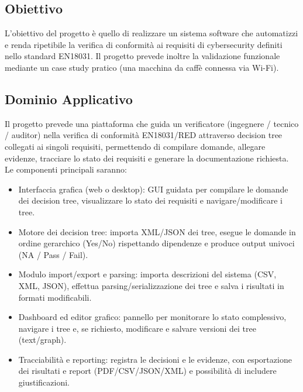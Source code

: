 \documentclass[a4paper,12pt]{article}
\begin{document}
    \subsection{Obiettivo}
    L’obiettivo del progetto è quello di realizzare un sistema software che automatizzi e renda ripetibile la verifica di conformità ai requisiti di cybersecurity definiti nello standard EN18031. Il progetto prevede inoltre la validazione funzionale mediante un case study pratico (una macchina da caffè connessa via Wi-Fi).
    \subsection{Dominio Applicativo}
    Il progetto prevede una piattaforma che guida un verificatore (ingegnere / tecnico / auditor) nella verifica di conformità EN18031/RED attraverso decision tree collegati ai singoli requisiti, permettendo di compilare domande, allegare evidenze, tracciare lo stato dei requisiti e generare la documentazione richiesta.\\
    Le componenti principali saranno:
    \begin{itemize}
        \item Interfaccia grafica (web o desktop): GUI guidata per compilare le domande dei decision tree, visualizzare lo stato dei requisiti e navigare/modificare i tree.
        \item Motore dei decision tree: importa XML/JSON dei tree, esegue le domande in ordine gerarchico (Yes/No) rispettando dipendenze e produce output univoci (NA / Pass / Fail).
        \item Modulo import/export e parsing: importa descrizioni del sistema (CSV, XML, JSON), effettua parsing/serializzazione dei tree e salva i risultati in formati modificabili.
        \item Dashboard ed editor grafico: pannello per monitorare lo stato complessivo, navigare i tree e, se richiesto, modificare e salvare versioni dei tree (text/graph).
        \item Tracciabilità e reporting: registra le decisioni e le evidenze, con esportazione dei risultati e report (PDF/CSV/JSON/XML) e possibilità di includere giustificazioni.
    \end{itemize}
\end{document}
